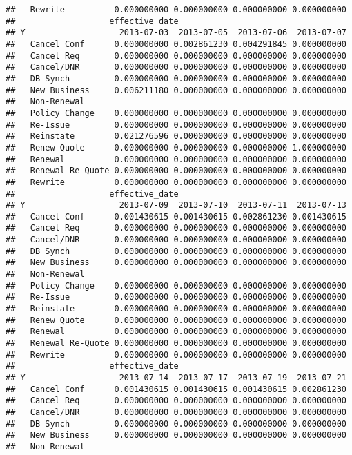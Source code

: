\documentclass[]{article}
\begin{document}
\begin{verbatim}
##   Rewrite          0.000000000 0.000000000 0.000000000 0.000000000
##                   effective_date
## Y                   2013-07-03  2013-07-05  2013-07-06  2013-07-07
##   Cancel Conf      0.000000000 0.002861230 0.004291845 0.000000000
##   Cancel Req       0.000000000 0.000000000 0.000000000 0.000000000
##   Cancel/DNR       0.000000000 0.000000000 0.000000000 0.000000000
##   DB Synch         0.000000000 0.000000000 0.000000000 0.000000000
##   New Business     0.006211180 0.000000000 0.000000000 0.000000000
##   Non-Renewal                                                     
##   Policy Change    0.000000000 0.000000000 0.000000000 0.000000000
##   Re-Issue         0.000000000 0.000000000 0.000000000 0.000000000
##   Reinstate        0.021276596 0.000000000 0.000000000 0.000000000
##   Renew Quote      0.000000000 0.000000000 0.000000000 1.000000000
##   Renewal          0.000000000 0.000000000 0.000000000 0.000000000
##   Renewal Re-Quote 0.000000000 0.000000000 0.000000000 0.000000000
##   Rewrite          0.000000000 0.000000000 0.000000000 0.000000000
##                   effective_date
## Y                   2013-07-09  2013-07-10  2013-07-11  2013-07-13
##   Cancel Conf      0.001430615 0.001430615 0.002861230 0.001430615
##   Cancel Req       0.000000000 0.000000000 0.000000000 0.000000000
##   Cancel/DNR       0.000000000 0.000000000 0.000000000 0.000000000
##   DB Synch         0.000000000 0.000000000 0.000000000 0.000000000
##   New Business     0.000000000 0.000000000 0.000000000 0.000000000
##   Non-Renewal                                                     
##   Policy Change    0.000000000 0.000000000 0.000000000 0.000000000
##   Re-Issue         0.000000000 0.000000000 0.000000000 0.000000000
##   Reinstate        0.000000000 0.000000000 0.000000000 0.000000000
##   Renew Quote      0.000000000 0.000000000 0.000000000 0.000000000
##   Renewal          0.000000000 0.000000000 0.000000000 0.000000000
##   Renewal Re-Quote 0.000000000 0.000000000 0.000000000 0.000000000
##   Rewrite          0.000000000 0.000000000 0.000000000 0.000000000
##                   effective_date
## Y                   2013-07-14  2013-07-17  2013-07-19  2013-07-21
##   Cancel Conf      0.001430615 0.001430615 0.001430615 0.002861230
##   Cancel Req       0.000000000 0.000000000 0.000000000 0.000000000
##   Cancel/DNR       0.000000000 0.000000000 0.000000000 0.000000000
##   DB Synch         0.000000000 0.000000000 0.000000000 0.000000000
##   New Business     0.000000000 0.000000000 0.000000000 0.000000000
##   Non-Renewal                                                     

\end{verbatim}
\end{document}
